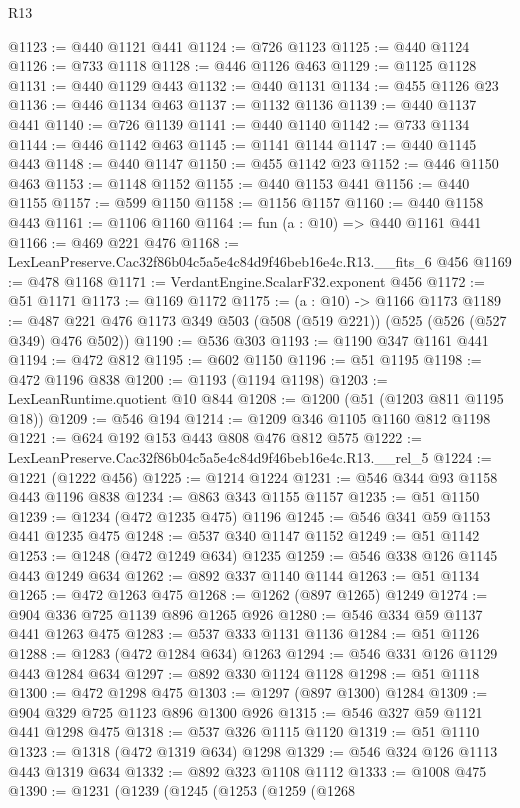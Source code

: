 \begin{lexlean}{R13}
\begin{coremodule}
@1123 := @440 @1121 @441
@1124 := @726 @1123
@1125 := @440 @1124
@1126 := @733 @1118
@1128 := @446 @1126 @463
@1129 := @1125 @1128
@1131 := @440 @1129 @443
@1132 := @440 @1131
@1134 := @455 @1126 @23
@1136 := @446 @1134 @463
@1137 := @1132 @1136
@1139 := @440 @1137 @441
@1140 := @726 @1139
@1141 := @440 @1140
@1142 := @733 @1134
@1144 := @446 @1142 @463
@1145 := @1141 @1144
@1147 := @440 @1145 @443
@1148 := @440 @1147
@1150 := @455 @1142 @23
@1152 := @446 @1150 @463
@1153 := @1148 @1152
@1155 := @440 @1153 @441
@1156 := @440 @1155
@1157 := @599 @1150
@1158 := @1156 @1157
@1160 := @440 @1158 @443
@1161 := @1106 @1160
@1164 := fun (a : @10) => @440 @1161 @441
@1166 := @469 @221 @476
@1168 := LexLeanPreserve.Cac32f86b04c5a5e4c84d9f46beb16e4c.R13.__fits_6 @456
@1169 := @478 @1168
@1171 := VerdantEngine.ScalarF32.exponent @456
@1172 := @51 @1171
@1173 := @1169 @1172
@1175 := (a : @10) -> @1166 @1173
@1189 := @487 @221 @476 @1173 @349 @503 (@508 (@519 @221)) (@525 (@526 (@527 @349) @476 @502))
@1190 := @536 @303
@1193 := @1190 @347 @1161 @441
@1194 := @472 @812
@1195 := @602 @1150
@1196 := @51 @1195
@1198 := @472 @1196 @838
@1200 := @1193 (@1194 @1198)
@1203 := LexLeanRuntime.quotient @10 @844
@1208 := @1200 (@51 (@1203 @811 @1195 @18))
@1209 := @546 @194
@1214 := @1209 @346 @1105 @1160 @812 @1198
@1221 := @624 @192 @153 @443 @808 @476 @812 @575
@1222 := LexLeanPreserve.Cac32f86b04c5a5e4c84d9f46beb16e4c.R13.__rel_5
@1224 := @1221 (@1222 @456)
@1225 := @1214 @1224
@1231 := @546 @344 @93 @1158 @443 @1196 @838
@1234 := @863 @343 @1155 @1157
@1235 := @51 @1150
@1239 := @1234 (@472 @1235 @475) @1196
@1245 := @546 @341 @59 @1153 @441 @1235 @475
@1248 := @537 @340 @1147 @1152
@1249 := @51 @1142
@1253 := @1248 (@472 @1249 @634) @1235
@1259 := @546 @338 @126 @1145 @443 @1249 @634
@1262 := @892 @337 @1140 @1144
@1263 := @51 @1134
@1265 := @472 @1263 @475
@1268 := @1262 (@897 @1265) @1249
@1274 := @904 @336 @725 @1139 @896 @1265 @926
@1280 := @546 @334 @59 @1137 @441 @1263 @475
@1283 := @537 @333 @1131 @1136
@1284 := @51 @1126
@1288 := @1283 (@472 @1284 @634) @1263
@1294 := @546 @331 @126 @1129 @443 @1284 @634
@1297 := @892 @330 @1124 @1128
@1298 := @51 @1118
@1300 := @472 @1298 @475
@1303 := @1297 (@897 @1300) @1284
@1309 := @904 @329 @725 @1123 @896 @1300 @926
@1315 := @546 @327 @59 @1121 @441 @1298 @475
@1318 := @537 @326 @1115 @1120
@1319 := @51 @1110
@1323 := @1318 (@472 @1319 @634) @1298
@1329 := @546 @324 @126 @1113 @443 @1319 @634
@1332 := @892 @323 @1108 @1112
@1333 := @1008 @475
@1390 := @1231
    (@1239
      (@1245
        (@1253
          (@1259
            (@1268

\end{coremodule}
\end{lexlean}

